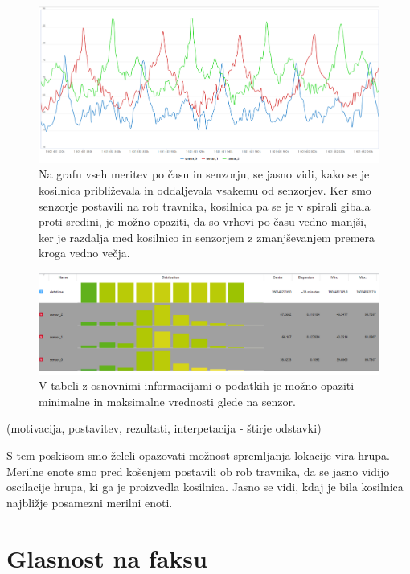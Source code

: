 \documentclass[a4paper, 12pt]{book}
\begin{document}
\begin{figure}[H]
    \centering
    \includegraphics[width=\linewidth]{slikovno_gradivo/kosilnica-graf.png}
    \caption{Na grafu vseh meritev po času in senzorju, se jasno vidi, kako se je kosilnica približevala in oddaljevala vsakemu od senzorjev. Ker smo senzorje postavili na rob travnika, kosilnica pa se je v spirali gibala proti sredini, je možno opaziti, da so vrhovi po času vedno manjši, ker je razdalja med kosilnico in senzorjem z zmanjševanjem premera kroga vedno večja.}
    \label{fig:graf _kosilnica}
\end{figure}


\begin{figure}[H]
    \centering
    \includegraphics[width=\linewidth]{slikovno_gradivo/kosilnica-tabela-monmax.png}
    \caption{V tabeli z osnovnimi informacijami o podatkih je možno opaziti minimalne in maksimalne vrednosti glede na senzor.}
    \label{fig:tabela_kosilnica}
\end{figure}

(motivacija, postavitev, rezultati, interpetacija - štirje odstavki)

S tem poskisom smo želeli opazovati možnost spremljanja lokacije vira hrupa. Merilne enote smo pred košenjem postavili ob rob travnika, da se jasno vidijo oscilacije hrupa, ki ga je proizvedla kosilnica. 
Jasno se vidi, kdaj je bila kosilnica najbližje posamezni merilni enoti.


\section{Glasnost na faksu}
\end{document}
